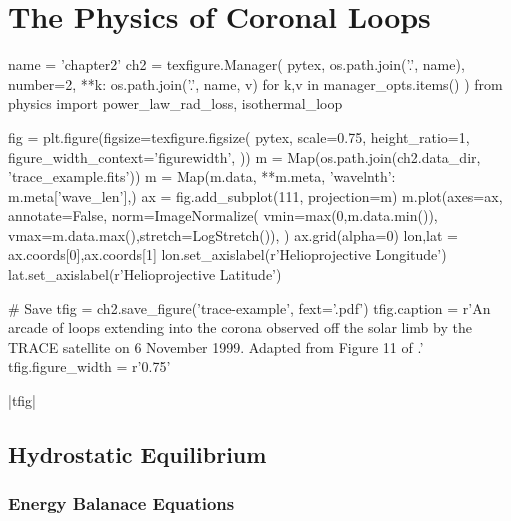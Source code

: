 \chapter{The Physics of Coronal Loops}\label{ch:loops}

\begin{pycode}[chapter2]
name = 'chapter2'
ch2 = texfigure.Manager(
    pytex,
    os.path.join('.', name),
    number=2,
    **{k: os.path.join('.', name, v) for k,v in manager_opts.items()}
)
from physics import power_law_rad_loss, isothermal_loop
\end{pycode}


\begin{pycode}[chapter2]
fig = plt.figure(figsize=texfigure.figsize(
    pytex,
    scale=0.75,
    height_ratio=1,
    figure_width_context='figurewidth',
))
m = Map(os.path.join(ch2.data_dir, 'trace_example.fits'))
m = Map(m.data, {**m.meta, 'wavelnth': m.meta['wave_len']},)
ax = fig.add_subplot(111, projection=m)
m.plot(axes=ax,
       annotate=False,
       norm=ImageNormalize(
           vmin=max(0,m.data.min()),
           vmax=m.data.max(),stretch=LogStretch()),
)
ax.grid(alpha=0)
lon,lat = ax.coords[0],ax.coords[1]
lon.set_axislabel(r'Helioprojective Longitude')
lat.set_axislabel(r'Helioprojective Latitude')

# Save
tfig = ch2.save_figure('trace-example', fext='.pdf')
tfig.caption = r'An arcade of loops extending into the corona observed off the solar limb by the TRACE satellite on 6 November 1999. Adapted from Figure 11 of \citet{reale_coronal_2010}.'
tfig.figure_width = r'0.75\textwidth'
\end{pycode}
\py[chapter2]|tfig|

\section{Hydrostatic Equilibrium}\label{sec:hydrostatic}

\subsection{Energy Balanace Equations}\label{sec:hydrostatic_equations}

